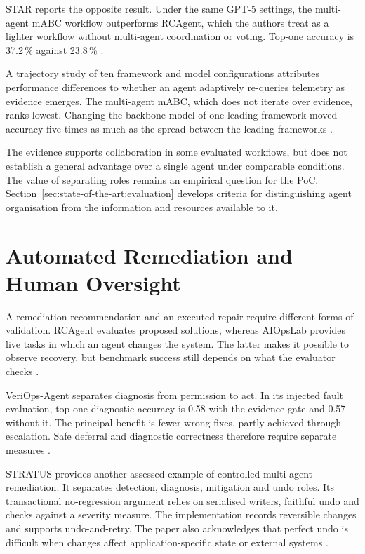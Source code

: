 STAR reports the opposite result. Under the same GPT-5 settings, the
multi-agent mABC workflow outperforms RCAgent, which the authors treat as
a lighter workflow without multi-agent
coordination or voting. Top-one accuracy is 37.2\,\% against
23.8\,\% \parencite[Table~II]{wang2026star}.

A trajectory study of ten framework and model configurations attributes
performance differences to whether an agent adaptively re-queries
telemetry as evidence emerges. The
multi-agent mABC, which does not iterate over evidence, ranks lowest.
Changing the backbone model of one leading framework moved accuracy five
times as much as the spread between the leading frameworks
\parencite[Section~5.1]{lu2026trajectory}.

The evidence supports collaboration in some evaluated workflows, but does
not establish a general advantage over a single agent under comparable
conditions. The value of separating roles remains an empirical question
for the PoC. Section~\ref{sec:state-of-the-art:evaluation} develops criteria
for distinguishing agent organisation from the information and resources
available to it.

\section{Automated Remediation and Human Oversight}
\label{sec:state-of-the-art:remediation}

A remediation recommendation and an executed repair require different
forms of validation. RCAgent evaluates proposed solutions, whereas
AIOpsLab provides live tasks in which an agent changes the system. The
latter makes it possible to observe recovery, but benchmark success still
depends on what the evaluator checks
\parencite{wang2024rcagent,chen2025aiopslab}.

VeriOps-Agent separates diagnosis from permission to act. In its injected
fault evaluation, top-one diagnostic accuracy is 0.58 with the evidence
gate and 0.57 without it. The principal benefit is fewer wrong fixes,
partly achieved through escalation. Safe deferral and diagnostic
correctness therefore require separate measures
\parencite[Table~II]{zheng2026veriops}.

STRATUS provides another assessed example of controlled
multi-agent remediation. It separates detection, diagnosis, mitigation
and undo roles. Its transactional no-regression argument relies on
serialised writers, faithful undo and checks against a severity measure.
The implementation records reversible changes and supports undo-and-retry.
The paper also acknowledges that perfect undo is difficult when changes
affect application-specific state or external systems
\parencite[Sections~3--4]{chen2025stratus}.

